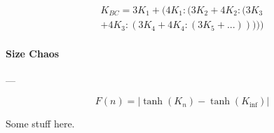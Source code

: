\documentclass[twocolumn,aps,showpacs,superscriptaddress,prl]{revtex4}
\begin{document}
\begin{equation}
\begin{split}
K_{BC} = 3K_1 + (4K_1:(3K_2 + 4K_2:(3K_3 \\
+ 4K_3:(3K_4 + 4K_4:(3K_5+ ...)))))
\end{split}
\label{eq:bc}
\end{equation}


\paragraph*{Size Chaos} ---

\begin{equation}
F(n) = | \tanh(K_n) - \tanh(K_{\inf}) |
\label{eq:cor}
\end{equation}



\begin{acknowledgments}

Some stuff here.

\end{acknowledgments}



\end{document}
